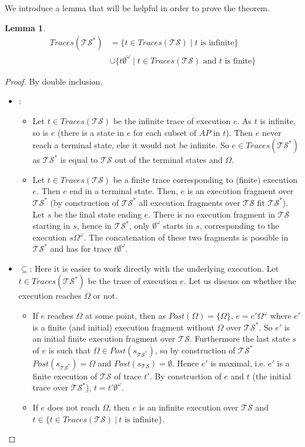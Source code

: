 \documentclass[11pt,a4paper]{article}
\def\ts{\mathcal{TS}}
\def\tss{\mathcal{TS^*}}
\def\traces{\mathit{Traces}}
\newtheorem*{lemma}{Lemma}
\begin{document}
\begin{Answer}
\Question%
We introduce a lemma that will be helpful in order to prove the theorem.
\begin{lemma}
  \begin{align*}
    \traces(\tss) &= \{t\in\traces(\ts) \mid t\text{ is infinite}\}\\
    &\cup\{t\emptyset^\omega \mid t\in\traces(\ts)\text{ and $t$ is finite}\}
  \end{align*}
\end{lemma}
\begin{proof}
  By double inclusion.\\
  \begin{itemize}
	  \item {}: %
	  \begin{itemize}
		  \item Let $t\in \traces(\ts)$ be the infinite trace of execution $e$. As $t$ is infinite, so is $e$ (there is a state in $e$ for each subset of $AP$ in $t$).
		  Then $e$ never reach a terminal state, else it would not be infinite. So $e\in \traces(\tss)$ as $\tss$ is equal to $\ts$ out of the terminal states and $\Omega$.
		  \item Let $t\in \traces(\ts)$ be a finite trace corresponding to (finite) execution $e$. Then $e$ end in a terminal state. Then, $e$ is an execution fragment over $\tss$
		  (by construction of $\tss$ all execution fragments over $\ts$ fit $\tss$). Let $s$ be the final state ending $e$. There is no execution fragment in $\ts$ starting in $s$,
		  hence in $\tss$, only $\emptyset^\omega$ starts in $s$, corresponding to the execution $s\Omega^\omega$. The concatenation of these two fragments is possible in $\tss$ and has for trace $t\emptyset^\omega$.
	  \end{itemize}
	  \item $\subseteq$: Here it is easier to work directly with the underlying execution.
	  Let $t\in \traces(\tss)$ be the trace of execution $e$. Let us discuss on whether the execution reaches $\Omega$ or not.
	  \begin{itemize}
		  \item If $e$ reaches $\Omega$ at some point, then as $Post(\Omega) = \{\Omega\}$, $e=e'\Omega^\omega$ where $e'$ is a finite (and initial) execution fragment without $\Omega$ over $\tss$.
		  So $e'$ is an initial finite execution fragment over $\ts$. Furthermore the last state $s$ of $e$ is such that $\Omega \in Post(s_{\tss})$, so by construction of $\tss$ $Post(s_{\tss})=\Omega$ and
		  $Post(s_{\ts})=\emptyset$. Hence $e'$ is maximal, i.e. $e'$ is a finite execution of $\ts$ of trace $t'$. By construction of $e$ and $t$ (the initial trace over $\tss$), $t = t'\emptyset^\omega$.
		  \item If $e$ does not reach $\Omega$, then $e$ is an infinite execution over $\ts$ and $t\in  \{t\in\traces(\ts)~|~t\text{ is infinite}\}$.
	  \end{itemize}
  \end{itemize}
\end{proof}



\end{Answer}
\end{document}
